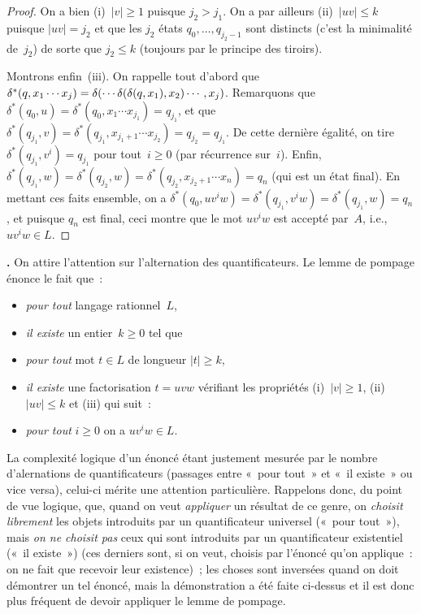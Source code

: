 \documentclass[12pt,a4paper]{article}
\theoremstyle{definition}
\newcommand\thingy{%
\refstepcounter{comcnt}\medskip\noindent\textbf{\thecomcnt.} }
\begin{document}
\begin{proof}
On a bien (i) $|v| \geq 1$ puisque $j_2 > j_1$.  On a par ailleurs
(ii) $|uv| \leq k$ puisque $|uv| = j_2$ et que les $j_2$ états
$q_0,\ldots,q_{j_2-1}$ sont distincts (c'est la minimalité de $j_2$)
de sorte que $j_2 \leq k$ (toujours par le principe des tiroirs).

Montrons enfin (iii).  On rappelle tout d'abord que
$\delta^*(q,x_1\cdots x_j) =\penalty0 \delta(\cdots\penalty500
\delta(\delta(q,x_1),x_2)\cdots,x_j)$.  Remarquons que
$\delta^*(q_0,u) = \delta^*(q_0,x_1\cdots x_{j_1}) = q_{j_1}$, et que
$\delta^*(q_{j_1},v) = \delta^*(q_{j_1},x_{j_1+1}\cdots x_{j_2}) =
q_{j_2} = q_{j_1}$.  De cette dernière égalité, on tire
$\delta^*(q_{j_1},v^i) = q_{j_1}$ pour tout $i \geq 0$ (par récurrence
sur $i$).  Enfin, $\delta^*(q_{j_1},w) = \delta^*(q_{j_2},w) =
\delta^*(q_{j_2}, x_{j_2+1}\cdots x_n) = q_n$ (qui est un état final).
En mettant ces faits ensemble, on a $\delta^*(q_0, uv^iw) =
\delta^*(q_{j_1}, v^iw) = \delta^*(q_{j_1}, w) = q_n$, et puisque
$q_n$ est final, ceci montre que le mot $uv^iw$ est accepté par $A$,
i.e., $uv^iw \in L$.
\end{proof}

\thingy On attire l'attention sur l'alternation des quantificateurs.
Le lemme de pompage énonce le fait que :
\begin{itemize}
\item\emph{pour tout} langage rationnel $L$,
\item\emph{il existe} un entier $k\geq 0$ tel que
\item\emph{pour tout} mot $t\in L$ de longueur $|t|\geq k$,
\item\emph{il existe} une factorisation $t=uvw$ vérifiant les
  propriétés (i) $|v|\geq 1$, (ii) $|uv|\leq k$ et (iii) qui suit :
\item\emph{pour tout} $i\geq 0$ on a $uv^iw \in L$.
\end{itemize}

La complexité logique d'un énoncé étant justement mesurée par le
nombre d'alernations de quantificateurs (passages entre « pour tout »
et « il existe » ou vice versa), celui-ci mérite une attention
particulière.  Rappelons donc, du point de vue logique, que, quand on
veut \emph{appliquer} un résultat de ce genre, on \emph{choisit
  librement} les objets introduits par un quantificateur universel
(« pour tout »), mais \emph{on ne choisit pas} ceux qui sont
introduits par un quantificateur existentiel (« il existe ») (ces
derniers sont, si on veut, choisis par l'énoncé qu'on applique : on ne
fait que recevoir leur existence) ; les choses sont inversées quand on
doit démontrer un tel énoncé, mais la démonstration a été faite
ci-dessus et il est donc plus fréquent de devoir appliquer le lemme de
pompage.
\end{document}

